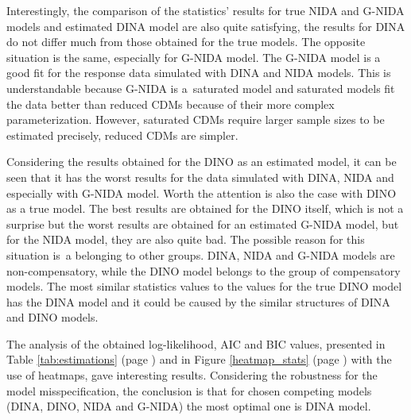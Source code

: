 \documentclass[english]{pwr_wmat_praca_dyplomowa}
\theoremstyle{plain}
\numberwithin{theorem}{chapter}
\theoremstyle{definition}
\numberwithin{theorem}{chapter}
\begin{document}
	Interestingly, the comparison of the statistics' results for true NIDA and G-NIDA models and estimated DINA model are also quite satisfying, the results for DINA do not differ much from those obtained for the true models. The opposite situation is the same, especially for G-NIDA model. The G-NIDA model is a good fit for the response data simulated with DINA and NIDA models. This is understandable because G-NIDA is a~saturated model and saturated models ﬁt the data better than reduced CDMs because of their more complex parameterization. However, saturated CDMs require larger sample sizes to be estimated precisely, reduced CDMs are simpler. 
	
	Considering the results obtained for the DINO as an estimated model, it can be seen that it has the worst results for the data simulated with DINA, NIDA and especially with G-NIDA model. Worth the attention is also the case with DINO as a true model. The best results are obtained for the DINO itself, which is not a surprise but the worst results are obtained for an estimated G-NIDA model, but for the NIDA model, they are also quite bad. The possible reason for this situation is~a belonging to other groups. DINA, NIDA and G-NIDA models are non-compensatory, while the DINO model belongs to the group of compensatory models. The most similar statistics values to the values for the true DINO model has the DINA model and it could be caused by the similar structures of DINA and DINO models. 
	
	The analysis of the obtained log-likelihood, AIC and BIC values, presented in Table \ref{tab:estimations} (page \pageref{tab:estimations}) and in Figure \ref{heatmap_stats} (page \pageref{heatmap_stats}) with the use of heatmaps, gave interesting results. Considering the robustness for the model misspecification, the conclusion is that for chosen competing models (DINA, DINO, NIDA and G-NIDA) the most optimal one is DINA model.
	
\end{document}
